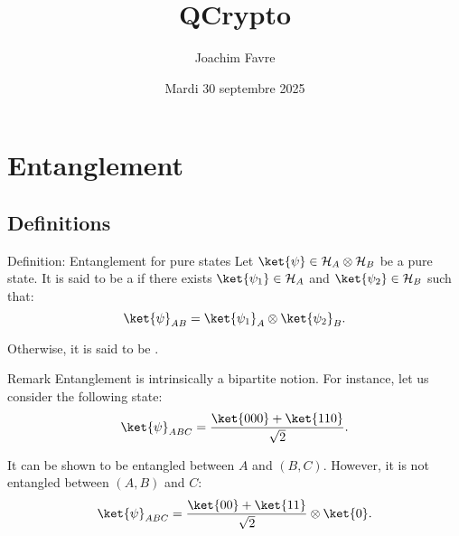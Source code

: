 \documentclass[a4paper]{article}
\title{QCrypto}
\author{Joachim Favre}
\date{Mardi 30 septembre 2025}
\begin{document}
\maketitle


\section{Entanglement}

\subsection{Definitions}

\begin{parag}{Definition: Entanglement for pure states}
    Let $\ket{\psi} \in \mathcal{H}_A \otimes \mathcal{H}_B$ be a pure state. It is said to be a  if there exists $\ket{\psi_1} \in \mathcal{H}_A$ and $\ket{\psi_2} \in \mathcal{H}_B$ such that: 
    \[\ket{\psi}_{AB} = \ket{\psi_1}_A \otimes \ket{\psi_2}_B.\]

    Otherwise, it is said to be .
    
    \begin{subparag}{Remark}
        Entanglement is intrinsically a bipartite notion. For instance, let us consider the following state: 
        \[\ket{\psi}_{ABC} = \frac{\ket{000} + \ket{110}}{\sqrt{2}}.\]

        It can be shown to be entangled between $A$ and $\left(B, C\right)$. However, it is not entangled between $\left(A, B\right)$ and $C$: 
        \[\ket{\psi}_{ABC} = \frac{\ket{00} + \ket{11}}{\sqrt{2}} \otimes \ket{0}.\]
    \end{subparag}
\end{parag}
\end{document}
